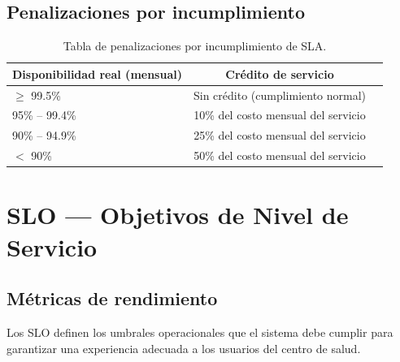 \documentclass[11pt,a4paper]{article}
\begin{document}
\subsection{Penalizaciones por incumplimiento}

\begin{table}[h!]
\centering
\begin{tabular}{lcc}
\toprule
\textbf{Disponibilidad real (mensual)} & \textbf{Crédito de servicio} \\
\midrule
$\geq$ 99.5\% & Sin crédito (cumplimiento normal) \\
95\% -- 99.4\% & 10\% del costo mensual del servicio \\
90\% -- 94.9\% & 25\% del costo mensual del servicio \\
$<$ 90\%       & 50\% del costo mensual del servicio \\
\bottomrule
\end{tabular}
\caption{Tabla de penalizaciones por incumplimiento de SLA.}
\end{table}

\section{SLO — Objetivos de Nivel de Servicio}

\subsection{Métricas de rendimiento}

Los SLO definen los umbrales operacionales que el sistema debe cumplir para
garantizar una experiencia adecuada a los usuarios del centro de salud.
\end{document}

